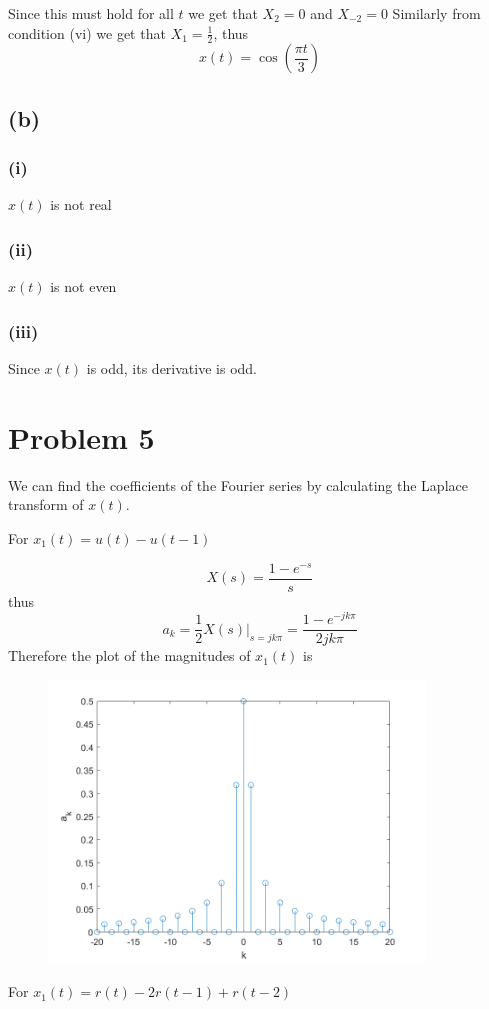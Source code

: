 \documentclass[12pt]{article}
\begin{document}
Since this must hold for all $t$ we get that $X_2=0$ and $X_{-2}=0$
Similarly from condition (vi) we get that $X_1=\frac{1}{2}$, thus
$$x(t)=\cos(\frac{\pi t}{3})$$
\subsection*{(b)}
\subsubsection*{(i)}
$x(t)$ is not real
\subsubsection*{(ii)}
$x(t)$ is not even
\subsubsection*{(iii)}
Since $x(t)$ is odd, its derivative is odd.
\section*{Problem 5}
We can find the coefficients of the Fourier series by calculating the Laplace transform of $x(t)$.

For $x_1(t)=u(t)-u(t-1)$

$$X(s)=\frac{1-e^{-s}}{s}$$
thus
$$a_k=\frac{1}{2}\left.X(s)\right|_{s=jk\pi}=\frac{1-e^{-jk\pi}}{2jk\pi}$$
Therefore the plot of the magnitudes of $x_1(t)$ is
\begin{center}
\begin{figure}[h]\includegraphics[width=10cm]{fig2}
\end{figure}
\end{center}

For $x_1(t)=r(t)-2r(t-1)+r(t-2)$
\end{document}

